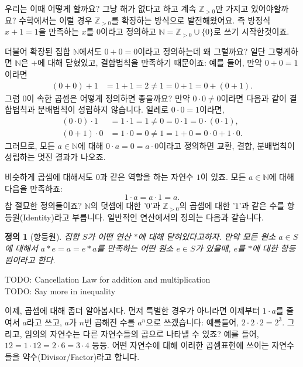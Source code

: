\documentclass[a4paper, 11pt]{report}
\renewcommand{\<}{\langle}
\renewcommand{\>}{\rangle}
\newtheorem{dfn}[thm]{정의}
\begin{document}
우리는 이때 어떻게 할까요? 그냥 해가 없다고 하고 계속 $\mathbb{Z}_{>0}$만 가지고 있어야할까요? 
수학에서는 이럴 경우 $\mathbb{Z}_{>0}$를 확장하는 방식으로 발전해왔어요. 즉 방정식 
$x + 1 = 1$을 만족하는 $x$를 $0$이라고 정의하고 $\mathbb{N} = \mathbb{Z}_{>0} \cup \{0\}$로 쓰기 
시작한것이죠. 


더불어 확장된 집합 $\mathbb{N}$에서도  $0 + 0 = 0$이라고 정의하는데 왜 그럴까요? 일단 그렇게하면 $\mathbb{N}$은 $+$에 대해 닫혔있고, 
결합법칙을 만족하기 때문이죠: 예를 들어, 만약 $0 + 0 = 1$이라면
\begin{align*}
    (0 + 0) + 1 &= 1 + 1 = 2 \neq 1 = 0 + 1 = 0 + (0 + 1).
\end{align*}
그럼 $0$이 속한 곱셈은 어떻게 정의하면 좋을까요? 만약 $0\cdot 0 \neq 0$이라면 다음과 같이 
결합법칙과 분배법칙이 성립하지 않습니다. 일례로 $0 \cdot 0 = 1$이라면,
\begin{align*}
  (0 \cdot 0) \cdot 1 &= 1 \cdot 1 = 1 \neq 0 = 0 \cdot 1 = 0 \cdot (0 \cdot 1),\\
  (0 + 1) \cdot 0 &= 1 \cdot 0 = 0 \neq 1 = 1 + 0 = 0 \cdot 0 + 1 \cdot 0.
\end{align*}
그러므로, 모든 $a \in \mathbb{N}$에 대해 $0\cdot a = 0 = a \cdot 0$이라고 정의하면 교환, 결합, 분배법칙이
성립하는 멋진 결과가 나오죠.

비슷하게 곱셈에 대해서도 $0$과 같은 역할을 하는 자연수 $1$이 있죠. 모든 $a \in \mathbb{N}$에 대해 다음을
만족하죠:
$$
1\cdot a = a \cdot 1 = a.
$$
참 절묘한 정의들이죠? $\mathbb{N}$의 덧셈에 대한 '$0$'과 $\mathbb{Z}_{>0}$의 
곱셈에 대한 '$1$'과 같은 수를 항등원(Identity)라고 부릅니다. 일반적인 연산에서의 정의는 다음과 같습니다.

\begin{dfn}[항등원] 집합 $S$가 어떤 연산 $*$에 대해 닫혀있다고하자. 만약 모든 원소 $a \in S$에 대해서
  $a*e = a = e*a$를 만족하는 어떤 원소 $e \in S$가 있을때, $e$를 $*$에 대한 항등원이라고 한다.
\end{dfn}

\fi

TODO: Cancellation Law for addition and multiplication\\
TODO: Say more in inequality

이제, 곱셈에 대해 좀더 알아봅시다. 먼저 특별한 경우가 아니라면 이제부터 $1\cdot a$를 줄여서 
$a$라고 쓰고, $a$가 $n$번 곱해진 수를 $a^n$으로 쓰겠습니다: 예를들어, $2\cdot2 \cdot 2 = 2^3$.
그리고, 임의의 자연수는 다른 자연수들의 곱으로 나타낼 수 있죠? 예를 들어,
$12 = 1\cdot12 = 2\cdot6 = 3\cdot 4$ 등등. 어떤 자연수에 대해 이러한 곱셈표현에 쓰이는 자연수들을 
약수(Divisor/Factor)라고 합니다.
\end{document}
